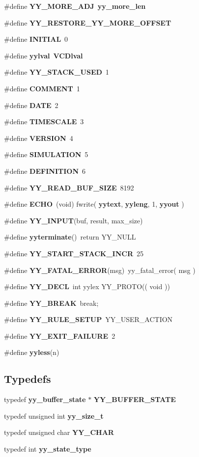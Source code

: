 \begin{CompactItemize}
\item 
\#define {\bf YY\_\-MORE\_\-ADJ}\ {\bf yy\_\-more\_\-len}
\item 
\#define {\bf YY\_\-RESTORE\_\-YY\_\-MORE\_\-OFFSET}
\item 
\#define {\bf INITIAL}\ 0
\item 
\#define {\bf yylval}\ {\bf VCDlval}
\item 
\#define {\bf YY\_\-STACK\_\-USED}\ 1
\item 
\#define {\bf COMMENT}\ 1
\item 
\#define {\bf DATE}\ 2
\item 
\#define {\bf TIMESCALE}\ 3
\item 
\#define {\bf VERSION}\ 4
\item 
\#define {\bf SIMULATION}\ 5
\item 
\#define {\bf DEFINITION}\ 6
\item 
\#define {\bf YY\_\-READ\_\-BUF\_\-SIZE}\ 8192
\item 
\#define {\bf ECHO}\ (void) fwrite( {\bf yytext}, {\bf yyleng}, 1, {\bf yyout} )
\item 
\#define {\bf YY\_\-INPUT}(buf, result, max\_\-size)
\item 
\#define {\bf yyterminate}()\ return YY\_\-NULL
\item 
\#define {\bf YY\_\-START\_\-STACK\_\-INCR}\ 25
\item 
\#define {\bf YY\_\-FATAL\_\-ERROR}(msg)\ yy\_\-fatal\_\-error( msg )
\item 
\#define {\bf YY\_\-DECL}\ int yylex YY\_\-PROTO(( void ))
\item 
\#define {\bf YY\_\-BREAK}\ break;
\item 
\#define {\bf YY\_\-RULE\_\-SETUP}\ YY\_\-USER\_\-ACTION
\item 
\#define {\bf YY\_\-EXIT\_\-FAILURE}\ 2
\item 
\#define {\bf yyless}(n)
\end{CompactItemize}
\subsection*{Typedefs}
\begin{CompactItemize}
\item 
typedef {\bf yy\_\-buffer\_\-state} $\ast$ {\bf YY\_\-BUFFER\_\-STATE}
\item 
typedef unsigned int {\bf yy\_\-size\_\-t}
\item 
typedef unsigned char {\bf YY\_\-CHAR}
\item 
typedef int {\bf yy\_\-state\_\-type}
\end{CompactItemize}
